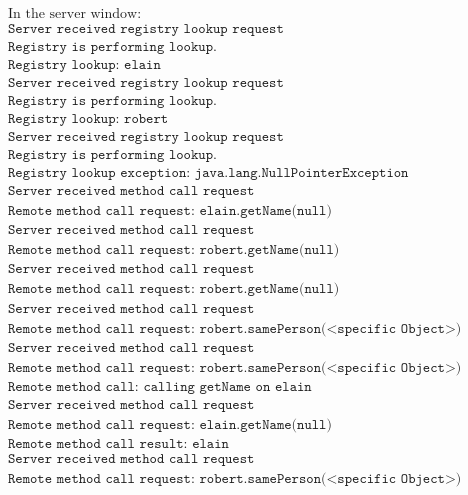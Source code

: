 \documentclass[12pt]{article}
\begin{document}
\begin{align*}
	&\text{In the server window:} \\
	&\texttt{Server received registry lookup request} \\
	&\texttt{Registry is performing lookup.} \\
	&\texttt{Registry lookup: elain} \\
	&\texttt{Server received registry lookup request} \\
	&\texttt{Registry is performing lookup.} \\
	&\texttt{Registry lookup: robert} \\
	&\texttt{Server received registry lookup request} \\
	&\texttt{Registry is performing lookup.} \\
	&\texttt{Registry lookup exception: java.lang.NullPointerException} \\
	&\texttt{Server received method call request} \\
	&\texttt{Remote method call request: elain.getName(null)} \\
	&\texttt{Server received method call request} \\
	&\texttt{Remote method call request: robert.getName(null)} \\
	&\texttt{Server received method call request} \\
	&\texttt{Remote method call request: robert.getName(null)} \\
	&\texttt{Server received method call request} \\
	&\texttt{Remote method call request: robert.samePerson(<specific Object>)} \\
	&\texttt{Server received method call request} \\
	&\texttt{Remote method call request: robert.samePerson(<specific Object>)} \\
	&\texttt{Remote method call: calling getName on elain} \\
	&\texttt{Server received method call request} \\
	&\texttt{Remote method call request: elain.getName(null)} \\
	&\texttt{Remote method call result: elain} \\
	&\texttt{Server received method call request} \\
	&\texttt{Remote method call request: robert.samePerson(<specific Object>)}
\end{align*}

\end{document}
